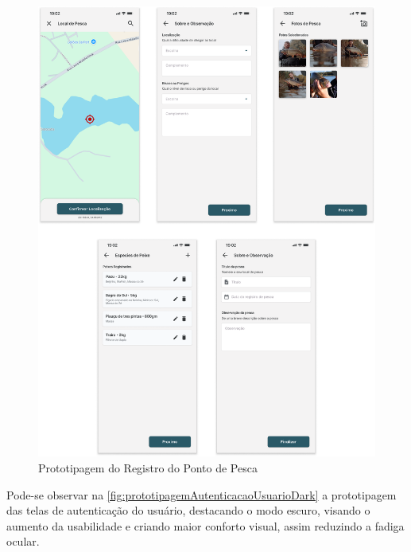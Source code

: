 \begin{figure}[H]
    \centering
    \caption{Prototipagem do Registro do Ponto de Pesca}
    \label{fig:prototipagemRegisterSpot}
    \includegraphics[scale=0.29]{./dados/figuras/prototipagem-spot-register.png}
\end{figure}


Pode-se observar na \autoref{fig:prototipagemAutenticacaoUsuarioDark} a prototipagem das telas de autenticação do usuário, destacando o modo escuro, visando o aumento da usabilidade e criando maior conforto visual, assim reduzindo a fadiga ocular.

